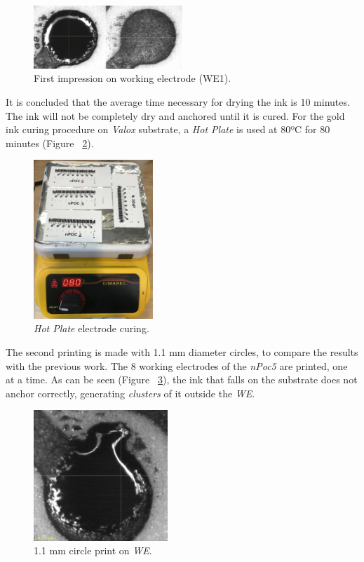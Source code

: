 \begin{figure}[H]
  \centering
    \includegraphics[width=0.5\textwidth]{Figures/Figura_Primera_impresion_circulo}
  \caption{First impression on working electrode (WE1).}
  \label{fig:Figura_Primera_impresion_circulo}
\end{figure}

It is concluded that the average time necessary for drying the ink is 10 minutes. The ink will not be completely dry and anchored until it is cured. For the gold ink curing procedure on \textit{Valox} substrate, a \textit{Hot Plate} is used at 80ºC for 80 minutes (Figure ~\ref{fig:Figura_Hot_Plate}).

\begin{figure}[H]
  \centering
    \includegraphics[width=0.4\textwidth]{Figures/Figura_Hot_Plate}
  \caption{\textit{Hot Plate} electrode curing.}
  \label{fig:Figura_Hot_Plate}
\end{figure}

The second printing is made with 1.1 mm diameter circles, to compare the results with the previous work. The 8 working electrodes of the \textit{nPoc5} are printed, one at a time. As can be seen (Figure ~\ref{fig:Figura_Segunda_Impresion_circulo}), the ink that falls on the substrate does not anchor correctly, generating \textit{clusters} of it outside the \emph{WE}.

\begin{figure}[H]
  \centering
    \includegraphics[width=0.45\textwidth]{Figures/Figura_Segunda_Impresion_circulo}
  \caption{1.1 mm circle print on \emph{WE}.}
  \label{fig:Figura_Segunda_Impresion_circulo}
\end{figure}


